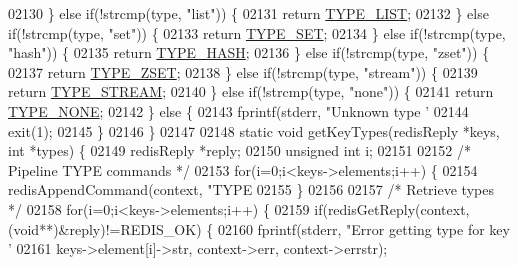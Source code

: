 \begin{DoxyCode}
{{{{{{{{{{{{{{{{{{{{{{{{{{{{{{{{{{{{{{{{{{{{{{{{{{{{{{{{{{{{{02130     \} \textcolor{keywordflow}{else} \textcolor{keywordflow}{if}(!strcmp(type, \textcolor{stringliteral}{"list"})) \{
02131         \textcolor{keywordflow}{return} \hyperlink{redis-cli_8c_a12d33da3418cfc67c9076ef7353ca50b}{TYPE\_LIST};
02132     \} \textcolor{keywordflow}{else} \textcolor{keywordflow}{if}(!strcmp(type, \textcolor{stringliteral}{"set"})) \{
02133         \textcolor{keywordflow}{return} \hyperlink{redis-cli_8c_a216111b323b4b6e3168596e69c72671b}{TYPE\_SET};
02134     \} \textcolor{keywordflow}{else} \textcolor{keywordflow}{if}(!strcmp(type, \textcolor{stringliteral}{"hash"})) \{
02135         \textcolor{keywordflow}{return} \hyperlink{redis-cli_8c_a2ee0b296ab2dd19e14df6f097d07981e}{TYPE\_HASH};
02136     \} \textcolor{keywordflow}{else} \textcolor{keywordflow}{if}(!strcmp(type, \textcolor{stringliteral}{"zset"})) \{
02137         \textcolor{keywordflow}{return} \hyperlink{redis-cli_8c_a9ffc96cc0a980403dc1df5cea83fb138}{TYPE\_ZSET};
02138     \} \textcolor{keywordflow}{else} \textcolor{keywordflow}{if}(!strcmp(type, \textcolor{stringliteral}{"stream"})) \{
02139         \textcolor{keywordflow}{return} \hyperlink{redis-cli_8c_a78458977895c28f708af92554a64a8ff}{TYPE\_STREAM};
02140     \} \textcolor{keywordflow}{else} \textcolor{keywordflow}{if}(!strcmp(type, \textcolor{stringliteral}{"none"})) \{
02141         \textcolor{keywordflow}{return} \hyperlink{redis-cli_8c_aa47d3c2fa05e95455d76cf052f9cca68}{TYPE\_NONE};
02142     \} \textcolor{keywordflow}{else} \{
02143         fprintf(stderr, \textcolor{stringliteral}{"Unknown type '%
02144         exit(1);
02145     \}
02146 \}
02147 
02148 \textcolor{keyword}{static} \textcolor{keywordtype}{void} getKeyTypes(redisReply *keys, \textcolor{keywordtype}{int} *types) \{
02149     redisReply *reply;
02150     \textcolor{keywordtype}{unsigned} \textcolor{keywordtype}{int} i;
02151 
02152     \textcolor{comment}{/* Pipeline TYPE commands */}
02153     \textcolor{keywordflow}{for}(i=0;i<keys->elements;i++) \{
02154         redisAppendCommand(context, \textcolor{stringliteral}{"TYPE %
02155     \}
02156 
02157     \textcolor{comment}{/* Retrieve types */}
02158     \textcolor{keywordflow}{for}(i=0;i<keys->elements;i++) \{
02159         \textcolor{keywordflow}{if}(redisGetReply(context, (\textcolor{keywordtype}{void}**)&reply)!=REDIS\_OK) \{
02160             fprintf(stderr, \textcolor{stringliteral}{"Error getting type for key '%
02161                 keys->element[i]->str, context->err, context->errstr);
}}}}}}}}}}}}}}}}}}}}}}}}}}}}}}}}}}}}}}}}}}}}}}}}}}}}}}}}}}}}}}}}
\end{DoxyCode}
